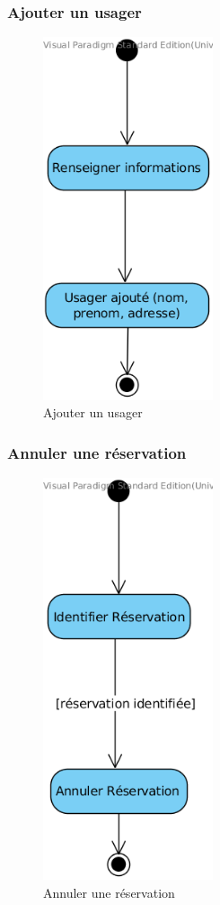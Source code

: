 \documentclass[a4paper,12pt]{article}
\begin{document}
\clearpage
\subsubsection{Ajouter un usager}
\label{sec:orgheadline22}

\begin{figure}[!htpb]
\centering
\includegraphics[width=5cm]{./res/img/ajouter-usager.png}
\caption{\label{fig:orgparagraph13}
Ajouter un usager}
\end{figure}

\clearpage
\subsubsection{Annuler une réservation}
\label{sec:orgheadline23}

\begin{figure}[!htpb]
\centering
\includegraphics[width=5cm]{./res/img/annuler-reservation.png}
\caption{\label{fig:orgparagraph14}
Annuler une réservation}
\end{figure}
\end{document}
